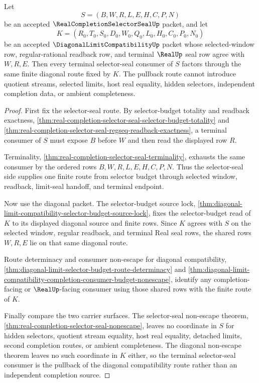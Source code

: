\begin{theorem}
\label{thm:real-completion-selector-seal-diagonal-compatibility-pullback}
Let
$$
S=(B,W,R,L,E,H,C,P,N)
$$
be an accepted $\RealCompletionSelectorSealUp$ packet, and let
$$
K=(R_0,T_0,S_0,D_0,W_0,Q_0,L_0,H_0,C_0,P_0,N_0)
$$
be an accepted $\DiagonalLimitCompatibilityUp$ packet whose selected-window row, regular-rational readback row, and terminal $\RealUp$ seal row agree with $W,R,E$. Then every terminal selector-seal consumer of $S$ factors through the same finite diagonal route fixed by $K$. The pullback route cannot introduce quotient streams, selected limits, host real equality, hidden selectors, independent completion data, or ambient completeness.
\end{theorem}
\begin{proof}
First fix the selector-seal route. By selector-budget totality and readback exactness, \autoref{thm:real-completion-selector-seal-selector-budget-totality} and \autoref{thm:real-completion-selector-seal-regseq-readback-exactness}, a terminal consumer of $S$ must expose $B$ before $W$ and then read the displayed row $R$.

Terminality, \autoref{thm:real-completion-selector-seal-terminality}, exhausts the same consumer by the ordered rows $B,W,R,L,E,H,C,P,N$. Thus the selector-seal side supplies one finite route from selector budget through selected window, readback, limit-seal handoff, and terminal endpoint.

Now use the diagonal packet. The selector-budget source lock, \autoref{thm:diagonal-limit-compatibility-selector-budget-source-lock}, fixes the selector-budget read of $K$ to its displayed diagonal source and finite rows. Since $K$ agrees with $S$ on the selected window, regular readback, and terminal Real seal rows, the shared rows $W,R,E$ lie on that same diagonal route.

Route determinacy and consumer non-escape for diagonal compatibility, \autoref{thm:diagonal-limit-selector-budget-route-determinacy} and \autoref{thm:diagonal-limit-compatibility-completion-consumer-budget-nonescape}, identify any completion-facing or $\RealUp$-facing consumer using those shared rows with the finite route of $K$.

Finally compare the two carrier surfaces. The selector-seal non-escape theorem, \autoref{thm:real-completion-selector-seal-nonescape}, leaves no coordinate in $S$ for hidden selectors, quotient stream equality, host real equality, detached limits, second completion routes, or ambient completeness. The diagonal non-escape theorem leaves no such coordinate in $K$ either, so the terminal selector-seal consumer is the pullback of the diagonal compatibility route rather than an independent completion source.
\end{proof}

